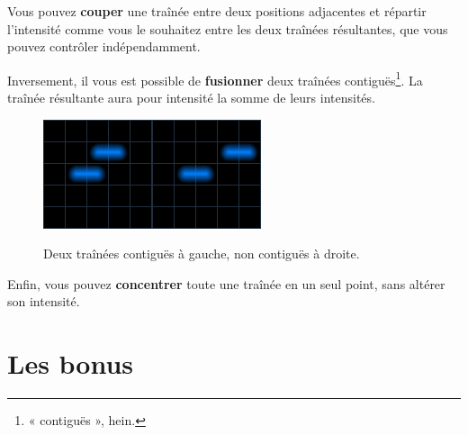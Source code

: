 Vous pouvez \textbf{couper} une traînée entre deux positions adjacentes et répartir l'intensité comme vous le souhaitez entre les deux traînées résultantes, que vous pouvez contrôler indépendamment.

Inversement, il vous est possible de \textbf{fusionner} deux traînées contiguës\footnote{« contiguës », hein.}. La traînée résultante aura pour intensité la somme de leurs intensités.

\begin{figure}[h]
\centering
\includegraphics{contigues.png}\hspace{5mm}\includegraphics{noncontigues.png}
\caption{Deux traînées contiguës à gauche, non contiguës à droite.}
\end{figure}

Enfin, vous pouvez \textbf{concentrer} toute une traînée en un seul point, sans altérer son intensité.

\newpage
\section{Les bonus}\label{bonus}


